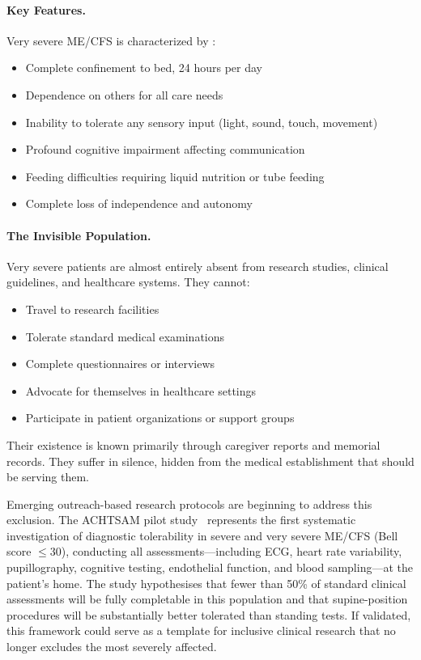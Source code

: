 \paragraph{Key Features.}
Very severe ME/CFS is characterized by \cite{NICE2021mecfs}:
\begin{itemize}
    \item Complete confinement to bed, 24 hours per day
    \item Dependence on others for all care needs
    \item Inability to tolerate any sensory input (light, sound, touch, movement)
    \item Profound cognitive impairment affecting communication
    \item Feeding difficulties requiring liquid nutrition or tube feeding
    \item Complete loss of independence and autonomy
\end{itemize}

\paragraph{The Invisible Population.}
Very severe patients are almost entirely absent from research studies, clinical guidelines, and healthcare systems. They cannot:
\begin{itemize}
    \item Travel to research facilities
    \item Tolerate standard medical examinations
    \item Complete questionnaires or interviews
    \item Advocate for themselves in healthcare settings
    \item Participate in patient organizations or support groups
\end{itemize}

Their existence is known primarily through caregiver reports and memorial records. They suffer in silence, hidden from the medical establishment that should be serving them.

Emerging outreach-based research protocols are beginning to address this exclusion.
The ACHTSAM pilot study~\cite{Fricke2026achtsam} represents the first systematic
investigation of diagnostic tolerability in severe and very severe ME/CFS
(Bell score $\leq$30), conducting all assessments---including ECG, heart rate
variability, pupillography, cognitive testing, endothelial function, and blood
sampling---at the patient's home. The study hypothesises that fewer than 50\%
of standard clinical assessments will be fully completable in this population
and that supine-position procedures will be substantially better tolerated than
standing tests. If validated, this framework could serve as a template for
inclusive clinical research that no longer excludes the most severely affected.

